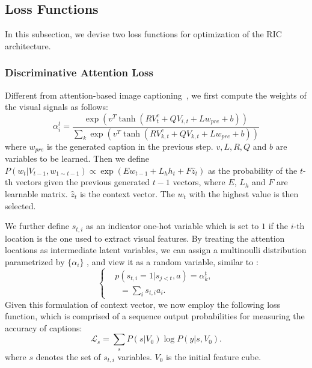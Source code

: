 \documentclass[10pt,twocolumn,letterpaper]{article}
\begin{document}
	
	\subsection{Loss Functions}\label{sec:loss}
	In this subsection, we devise two loss functions for optimization of the RIC architecture.
	
	\subsubsection{Discriminative Attention Loss}
	Different from attention-based image captioning~\cite{xu2015show}, we first compute the weights of the visual signals as follows:
	\begin{equation}
	\alpha _i^t = \frac{{\exp ({v^T}\tanh (RV_t^c + Q{V_{i,t}} + L{w_{pre}} + b))}}{{\sum\nolimits_{k} {\exp ({v^T}\tanh (RV_{k,t}^c + Q{V_{k,t}} + L{w_{pre}} + b))} }}
	\end{equation}
	where $w_{pre}$ is the generated caption in the previous step. %
	$v, L, R, Q$ and $b$ are variables to be learned. Then we define $P({{w_t}} |V_{t-1},{w_{1\sim t - 1}}) \propto \exp (E{w_{t - 1}} + {L_h}{h_t} + F{\hat z_t})$ as the probability of the $t$-th vectors given the previous generated $t-1$ vectors, where $E$, $L_h$ and $F$ are learnable matrix. ${\hat z_t}$ is the context vector. The $w_t$ with the highest value is then selected.
	
	We further define $s_{t,i}$ as an indicator one-hot variable which is set to $1$ if the $i$-{th} location is the one used to extract visual features. By treating the attention locations as intermediate latent variables, we can assign a multinoulli distribution parametrized by $\{\alpha _i\}$ , and view it as a random variable, similar to \cite{xu2015show}:
	\begin{equation}
	\left\{
	\begin{aligned}
	&p({s_{t,i}} = 1|{s_{j < t}},a) = {\alpha^t_{k}},\\
	&\mathop {{\hat z_t}}   = \sum\nolimits_i {{s_{t,i}}{a_i}}.
	\end{aligned}
	\right.
	\end{equation}
	Given this formulation of context vector, we now employ the following loss function, which is comprised of a sequence output probabilities for measuring the accuracy of captions:
	\begin{equation}
	\label{eq.objective}
	\mathcal{L}_s = \sum\limits_s {P(\left. s \right|V_0)} \log P(\left. y \right|s,V_0).
	\end{equation}
	where $s$ denotes the set of $s_{t,i}$ variables. $V_0$ is the initial feature cube.
	
\end{document}
